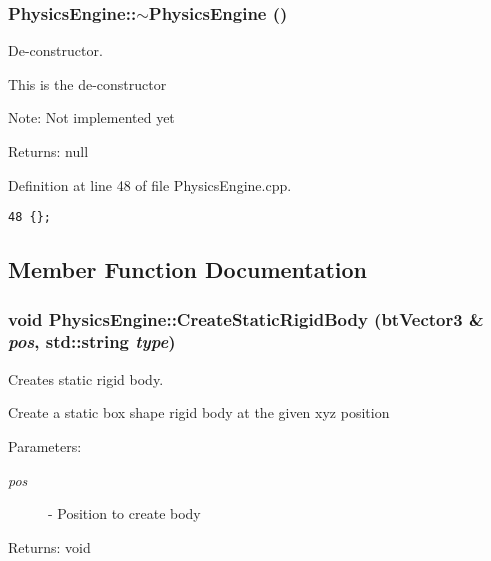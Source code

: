 \hypertarget{class_physics_engine_e5f076ee99bbfdbc79ab2d27366d8476}{
\subsubsection[$\sim$PhysicsEngine]{\setlength{\rightskip}{0pt plus 5cm}PhysicsEngine::$\sim$PhysicsEngine ()}}
\label{class_physics_engine_e5f076ee99bbfdbc79ab2d27366d8476}


De-constructor. 

This is the de-constructor

\begin{Desc}
\item[Note:]Not implemented yet\end{Desc}
\begin{Desc}
\item[Returns:]null \end{Desc}


Definition at line 48 of file PhysicsEngine.cpp.

\begin{Code}\begin{verbatim}48 {};
\end{verbatim}
\end{Code}




\subsection{Member Function Documentation}
\hypertarget{class_physics_engine_2f5bb835773d64a6ff21933d5137c427}{
\subsubsection[CreateStaticRigidBody]{\setlength{\rightskip}{0pt plus 5cm}void PhysicsEngine::CreateStaticRigidBody (btVector3 \& {\em pos}, \/  std::string {\em type})}}
\label{class_physics_engine_2f5bb835773d64a6ff21933d5137c427}


Creates static rigid body. 

Create a static box shape rigid body at the given xyz position

\begin{Desc}
\item[Parameters:]
\begin{description}
\item[{\em pos}]- Position to create body\end{description}
\end{Desc}
\begin{Desc}
\item[Returns:]void \end{Desc}


